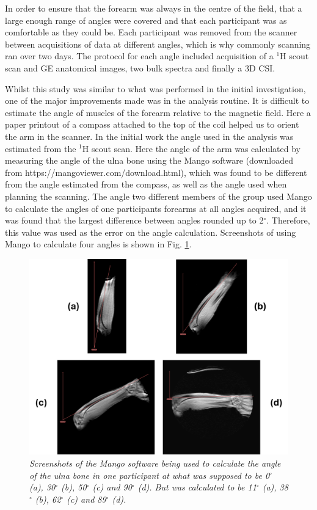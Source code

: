 In order to ensure that the forearm was always in the centre of the field, that a large enough range of angles were covered and that each participant was as comfortable as they could be. Each participant was removed from the scanner between acquisitions of data at different angles, which is why commonly scanning ran over two days. The protocol for each angle included  acquisition of a $^1$H scout scan and \ac{GE} anatomical images, two bulk spectra and finally a 3D \ac{CSI}. 

Whilst this study was similar to what was performed in the initial investigation, one of the major improvements made was in the analysis routine. It is difficult to estimate the angle of muscles of the forearm relative to the magnetic field. Here a paper printout of a compass attached to the top of the coil helped us to orient the arm in the scanner. In the initial work the angle used in the analysis was estimated from the $^1$H scout scan. Here the angle of the arm was calculated by measuring the angle of the ulna bone using the Mango software (downloaded from https://mangoviewer.com/download.html), which was found to be different from the angle estimated from the compass, as well as the angle used when planning the scanning. The angle two different members of the group used Mango to calculate the angles of one participants forearms at all angles acquired, and it was found that the largest difference between angles rounded up to 2$^\circ$. Therefore, this value was used as the error on the angle calculation. Screenshots of using Mango to calculate four angles is shown in Fig. \ref{fig:Quad:Example_Angle}.

\begin{figure}
    \centering
    \includegraphics[width=1\linewidth]{Figures/Quad/Angle_Example.png}
    \caption{\textit{Screenshots of the Mango software being used to calculate the angle of the ulna bone in one participant at what was supposed to be 0$^\circ$ (a), 30$^\circ$ (b), 50$^\circ$ (c) and 90$^\circ$ (d). But was calculated to be 11$^\circ$ (a), 38$^\circ$ (b), 62$^\circ$ (c) and 89$^\circ$ (d).}}
    \label{fig:Quad:Example_Angle}
\end{figure}

